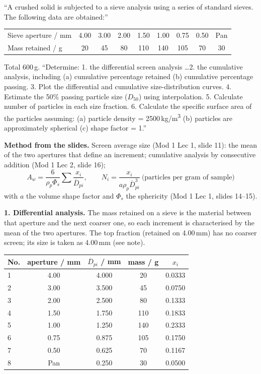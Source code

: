 \documentclass[10pt,a4paper]{article}
\newcommand{\spsub}[1]{\par\addvspace{7pt}\noindent{\color{accent}\bfseries #1}\par\addvspace{3pt}\nopagebreak}
\begin{document}
\begin{qbox}
``A crushed solid is subjected to a sieve analysis using a series of standard sieves. The following
data are obtained:''
\begin{center}\small
\begin{tabular}{@{}l *{8}{S[table-format=3.2]}@{}}
\toprule
{Sieve aperture / \si{\milli\meter}} & 4.00 & 3.00 & 2.00 & 1.50 & 1.00 & 0.75 & 0.50 & {Pan}\\
{Mass retained / \si{\gram}} & 20 & 45 & 80 & 110 & 140 & 105 & 70 & 30\\
\bottomrule
\end{tabular}
\end{center}
Total 600\,g. ``Determine: 1. the differential screen analysis \dots 2. the cumulative analysis,
including (a) cumulative percentage retained (b) cumulative percentage passing. 3. Plot the
differential and cumulative size-distribution curves. 4. Estimate the 50\% passing particle size
($D_{50}$) using interpolation. 5. Calculate number of particles in each size fraction.
6. Calculate the specific surface area of the particles assuming: (a) particle density =
2500\,kg/m\textsuperscript{3} (b) particles are approximately spherical (c) shape factor = 1.''
\end{qbox}

\begin{mthbox}
\textbf{Method from the slides.} Screen average size (Mod 1 Lec 1, slide 11): the mean of the two
apertures that define an increment; cumulative analysis by consecutive addition (Mod 1 Lec 2,
slide 16);
\[
A_w=\frac{6}{\rho_p\Phi_s}\sum\frac{x_i}{\overline{D}_{pi}},\qquad
N_i=\frac{x_i}{a\rho_p\overline{D}_{pi}^{3}}\ \text{(particles per gram of sample)}
\]
with $a$ the volume shape factor and $\Phi_s$ the sphericity (Mod 1 Lec 1, slides 14--15).
\end{mthbox}

\spsub{Solution}
\textbf{1. Differential analysis.} The mass retained on a sieve is the material between that aperture
and the next coarser one, so each increment is characterised by the mean of the two apertures. The
top fraction (retained on 4.00\,mm) has no coarser screen; its size is taken as 4.00\,mm (see note).
{\small
\begin{tabular}{@{}l S[table-format=1.3] S[table-format=1.4] S[table-format=3.0] S[table-format=1.4]@{}}
\toprule
{No.} & {aperture / \si{\milli\meter}} & {$\overline{D}_{pi}$ / \si{\milli\meter}} & {mass / \si{\gram}} & {$x_i$}\\
 & 4.00 & 4.000 & 20 & 0.0333\\
2 & 3.00 & 3.500 & 45 & 0.0750\\
3 & 2.00 & 2.500 & 80 & 0.1333\\
4 & 1.50 & 1.750 & 110 & 0.1833\\
5 & 1.00 & 1.250 & 140 & 0.2333\\
6 & 0.75 & 0.875 & 105 & 0.1750\\
7 & 0.50 & 0.625 & 70 & 0.1167\\
8 & Pan & 0.250 & 30 & 0.0500\\
\bottomrule
\end{tabular}}
\end{document}

